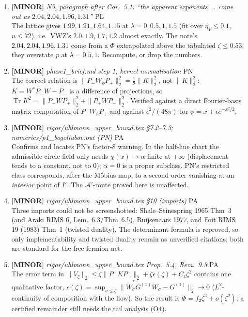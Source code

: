 \documentclass[11pt]{article}
\begin{document}
\begin{enumerate}[leftmargin=1.6em,itemsep=6pt]
\item \textbf{[MINOR]} \emph{N5, paragraph after Cor.~5.1: ``the apparent exponents \(\dots\) come out as \(2.04,2.04,1.96,1.31\)''} \hfill\textsc{PL}\\ The lattice gives \(1.99,1.91,1.64,1.15\) at \(\lambda=0,0.5,1,1.5\) (fit over \(\eta_V\le0.1\), \(n\le72\)), i.e.\ VWZ's \(2.0,1.9,1.7,1.2\) almost exactly. The note's \(2.04,2.04,1.96,1.31\) come from a \(\Phi\) extrapolated above the tabulated \(\zeta\le0.53\); they overstate \(p\) at \(\lambda=0.5,1\). Recompute, or drop the numbers.
\item \textbf{[MINOR]} \emph{phase1\_brief.md step 1, kernel normalisation} \hfill\textsc{PN}\\ The correct relation is \(\|P_-W_\phi P_+\|_2^2=\tfrac12\|K\|_2^2\), not \(\|K\|_2^2\): \(K=W^*P_-W-P_-\) is a difference of projections, so \(\operatorname{Tr}K^2=\|P_-WP_+\|_2^2+\|P_+WP_-\|_2^2\). Verified against a direct Fourier-basis matrix computation of \(P_-W_\phi P_+\) and against \(\epsilon^2/(48\pi)\) for \(\phi=x+\epsilon e^{-x^2/2}\).
\item \textbf{[MINOR]} \emph{rigor/uhlmann\_upper\_bound.tex \S7.2--7.3; numerics/p1\_bogoliubov.out (PN)} \hfill\textsc{PA}\\ Confirms and locates PN's factor-8 warning. In the half-line chart the admissible circle field only needs \(\chi(x)\to\alpha\) finite at \(+\infty\) (displacement tends to a constant, not to \(0\)); \(\alpha=0\) is a proper subclass. PN's restricted class corresponds, after the M\"obius map, to a second-order vanishing at an \emph{interior} point of \(I'\). The \(\mathcal A'\)-route proved here is unaffected.
\item \textbf{[MINOR]} \emph{rigor/uhlmann\_upper\_bound.tex \S10 (imports)} \hfill\textsc{PA}\\ Three imports could not be screenshotted: Shale--Stinespring 1965 Thm~3 (and Araki RIMS 6, Lem.~6.3/Thm~6.5), Ruijsenaars 1977, and Foit RIMS 19 (1983) Thm~1 (twisted duality). The determinant formula is reproved, so only implementability and twisted duality remain as unverified citations; both are standard for the free fermion net.
\item \textbf{[MINOR]} \emph{rigor/uhlmann\_upper\_bound.tex Prop.~5.4, Rem.~9.3} \hfill\textsc{PA}\\ The error term in \(\lVert V_\zeta\rVert_2\le\zeta\lVert P_-KP_+\rVert_2+\zeta\epsilon(\zeta)+C_4\zeta^2\) contains one qualitative factor, \(\epsilon(\zeta)=\sup_{\sigma\le\zeta}\lVert \widetilde W_\sigma^*G^{(1)}\widetilde W_\sigma-G^{(1)}\rVert_2\to0\) ($L^2$-continuity of composition with the flow). So the result is \(\Phi=f_2\zeta^2+o(\zeta^2)\); a certified remainder still needs the tail analysis (O4).

\end{enumerate}
\end{document}
